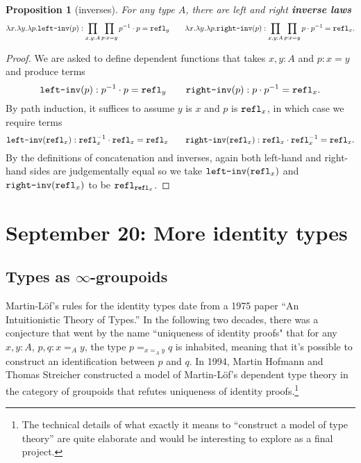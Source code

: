 \documentclass{amsart}
\theoremstyle{theorem}
\newtheorem*{prop}{Proposition}
\theoremstyle{definition}
\theoremstyle{remark}
\newcommand{\0}{\mathbbe{0}}
\newcommand{\1}{\mathbbe{1}}
\newcommand{\2}{\mathbbe{2}}
\newcommand{\3}{\mathbbe{3}}
\newcommand{\4}{\mathbbe{4}}
\newcommand{\term}[1]{{\textup{\texttt{#1}}}}
\newcommand{\refl}{\term{refl}}
\begin{document}
\begin{prop}[inverses] For any type $A$, there are left and right \textbf{inverse laws}
\[  \lambda x. \lambda y. \lambda p.\term{left-inv}(p) : \prod_{x,y :A} \prod_{p : x= y} p^{-1} \cdot p = \refl_y \qquad  \lambda x. \lambda y. \lambda p.\term{right-inv}(p) : \prod_{x,y :A} \prod_{p : x=y} p \cdot p^{-1} = \refl_x.\]
\end{prop}
\begin{proof}
We are asked to define  dependent functions that takes $x, y :A$ and $p : x = y$ and produce terms
\[ \term{left-inv}(p) : p^{-1} \cdot p = \refl_y \qquad \term{right-inv}(p) : p \cdot p^{-1} = \refl_x.\]
By path induction, it suffices to assume $y$ is $x$ and $p$ is $\refl_x$, in which case we require terms
\[ \term{left-inv}(\refl_x) : \refl_x^{-1} \cdot \refl_x = \refl_x \qquad \term{right-inv}(\refl_x) : \refl_x \cdot \refl_x^{-1} = \refl_x.\]
By the definitions of concatenation and inverses, again both left-hand and right-hand sides are judgementally equal so we take $\term{left-inv}(\refl_x)$ and $\term{right-inv}(\refl_x)$ to be $\refl_{\refl_x}$.
\end{proof}

\section*{September 20: More identity types}

\subsection*{Types as \texorpdfstring{$\infty$}{infinity}-groupoids}

Martin-L\"{o}f's rules for the identity types date from a 1975 paper ``An Intuitionistic Theory of Types.'' In the following two decades, there was a conjecture that went by the name ``uniqueness of identity proofs" that for any $x,y : A$, $p, q  : x =_A y$, the type $p =_{x=_A y} q$ is inhabited, meaning that it's possible to construct an identification between $p$ and $q$. In 1994, Martin Hofmann and Thomas Streicher constructed a model of Martin-L\"{o}f's dependent type theory in the category of groupoids that refutes uniqueness of identity proofs.\footnote{The technical details of what exactly it means to ``construct a model of type theory'' are quite elaborate and would be interesting to explore as a final project.}
\end{document}
